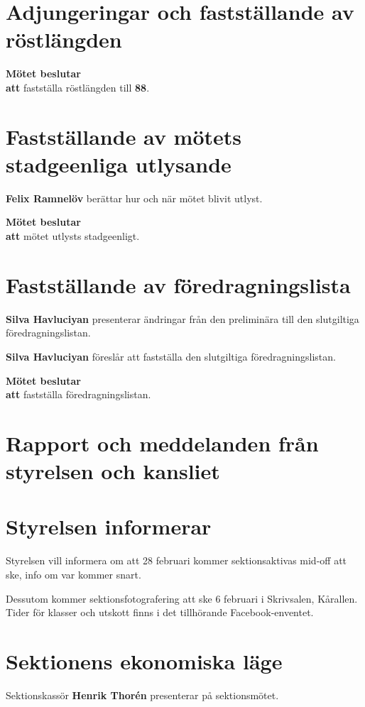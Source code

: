 \documentclass{datateknologsektionen-document}
\newcommand{\ind}{\hspace*{2em}}
\newcommand{\motetbeslutar}{\textbf{Mötet beslutar}}
\newcommand{\att}{\\\ind\textbf{att}}
\newcommand{\rostlangd}[1]{\motetbeslutar\att{} fastställa röstlängden till \textbf{#1}.}
\begin{document}
\section{Adjungeringar och fastställande av röstlängden}



\rostlangd{88}



\section{Fastställande av mötets stadgeenliga utlysande}
\textbf{Felix Ramnelöv} berättar hur och när mötet blivit utlyst.

\motetbeslutar\att{} mötet utlysts stadgeenligt.



\section{Fastställande av föredragningslista}
\textbf{Silva Havluciyan} presenterar ändringar från den preliminära till den slutgiltiga föredragningslistan.

\textbf{Silva Havluciyan} föreslår att fastställa den slutgiltiga föredragningslistan.

\motetbeslutar\att{} fastställa föredragningslistan.
\pagebreak


\section{Rapport och meddelanden från styrelsen och kansliet}



\section{Styrelsen informerar}
Styrelsen vill informera om att 28 februari kommer sektionsaktivas mid-off att ske, info om var kommer snart.

Dessutom kommer sektionsfotografering att ske 6 februari i Skrivsalen, Kårallen. Tider för klasser och utskott finns i det tillhörande Facebook-enventet.

\section{Sektionens ekonomiska läge}
Sektionskassör \textbf{Henrik Thorén} presenterar på sektionsmötet.
\end{document}
